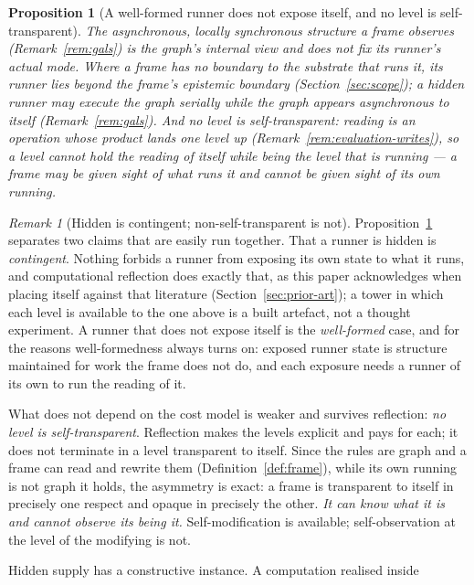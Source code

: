 \documentclass[11pt,a4paper]{article}
\newtheorem{proposition}[definition]{Proposition}
\theoremstyle{remark}\newtheorem{remark}[definition]{Remark}
\begin{document}
\begin{proposition}[A well-formed runner does not expose itself, and no level is self-transparent]\label{prop:runner-opaque}
The asynchronous, locally synchronous structure a frame observes (Remark~\ref{rem:gals}) is the graph's \emph{internal} view and does not fix its runner's actual mode. Where a frame has no boundary to the substrate that runs it, its runner lies beyond the frame's epistemic boundary (Section~\ref{sec:scope}); a hidden runner may execute the graph serially while the graph appears asynchronous to itself (Remark~\ref{rem:gals}). And no level is self-transparent: reading is an operation whose product lands one level up (Remark~\ref{rem:evaluation-writes}), so a level cannot hold the reading of itself while being the level that is running --- a frame may be given sight of what runs it and cannot be given sight of its own running.
\end{proposition}
\begin{remark}[Hidden is contingent; non-self-transparent is not]\label{rem:opacity-two-claims}
Proposition~\ref{prop:runner-opaque} separates two claims that are easily run together. That a runner is hidden is \emph{contingent}. Nothing forbids a runner from exposing its own state to what it runs, and computational reflection does exactly that, as this paper acknowledges when placing itself against that literature (Section~\ref{sec:prior-art}); a tower in which each level is available to the one above is a built artefact, not a thought experiment. A runner that does not expose itself is the \emph{well-formed} case, and for the reasons well-formedness always turns on: exposed runner state is structure maintained for work the frame does not do, and each exposure needs a runner of its own to run the reading of it.

What does not depend on the cost model is weaker and survives reflection: \emph{no level is self-transparent}. Reflection makes the levels explicit and pays for each; it does not terminate in a level transparent to itself. Since the rules are graph and a frame can read and rewrite them (Definition~\ref{def:frame}), while its own running is not graph it holds, the asymmetry is exact: a frame is transparent to itself in precisely one respect and opaque in precisely the other. \emph{It can know what it is and cannot observe its being it.} Self-modification is available; self-observation at the level of the modifying is not.
\end{remark}
Hidden supply has a constructive instance. A computation realised inside
\end{document}
